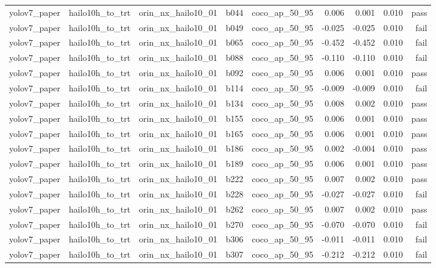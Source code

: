 \begin{table}[t]
\begin{tabular}{lrrrrrrrr}
yolov7\_paper & hailo10h\_to\_trt & orin\_nx\_hailo10\_01 & b044 & coco\_ap\_50\_95 & 0.006 & 0.001 & 0.010 & pass \\
yolov7\_paper & hailo10h\_to\_trt & orin\_nx\_hailo10\_01 & b049 & coco\_ap\_50\_95 & -0.025 & -0.025 & 0.010 & fail \\
yolov7\_paper & hailo10h\_to\_trt & orin\_nx\_hailo10\_01 & b065 & coco\_ap\_50\_95 & -0.452 & -0.452 & 0.010 & fail \\
yolov7\_paper & hailo10h\_to\_trt & orin\_nx\_hailo10\_01 & b088 & coco\_ap\_50\_95 & -0.110 & -0.110 & 0.010 & fail \\
yolov7\_paper & hailo10h\_to\_trt & orin\_nx\_hailo10\_01 & b092 & coco\_ap\_50\_95 & 0.006 & 0.001 & 0.010 & pass \\
yolov7\_paper & hailo10h\_to\_trt & orin\_nx\_hailo10\_01 & b114 & coco\_ap\_50\_95 & -0.009 & -0.009 & 0.010 & fail \\
yolov7\_paper & hailo10h\_to\_trt & orin\_nx\_hailo10\_01 & b134 & coco\_ap\_50\_95 & 0.008 & 0.002 & 0.010 & pass \\
yolov7\_paper & hailo10h\_to\_trt & orin\_nx\_hailo10\_01 & b155 & coco\_ap\_50\_95 & 0.006 & 0.001 & 0.010 & pass \\
yolov7\_paper & hailo10h\_to\_trt & orin\_nx\_hailo10\_01 & b165 & coco\_ap\_50\_95 & 0.006 & 0.001 & 0.010 & pass \\
yolov7\_paper & hailo10h\_to\_trt & orin\_nx\_hailo10\_01 & b186 & coco\_ap\_50\_95 & 0.002 & -0.004 & 0.010 & pass \\
yolov7\_paper & hailo10h\_to\_trt & orin\_nx\_hailo10\_01 & b189 & coco\_ap\_50\_95 & 0.006 & 0.001 & 0.010 & pass \\
yolov7\_paper & hailo10h\_to\_trt & orin\_nx\_hailo10\_01 & b222 & coco\_ap\_50\_95 & 0.007 & 0.002 & 0.010 & pass \\
yolov7\_paper & hailo10h\_to\_trt & orin\_nx\_hailo10\_01 & b228 & coco\_ap\_50\_95 & -0.027 & -0.027 & 0.010 & fail \\
yolov7\_paper & hailo10h\_to\_trt & orin\_nx\_hailo10\_01 & b262 & coco\_ap\_50\_95 & 0.007 & 0.002 & 0.010 & pass \\
yolov7\_paper & hailo10h\_to\_trt & orin\_nx\_hailo10\_01 & b270 & coco\_ap\_50\_95 & -0.070 & -0.070 & 0.010 & fail \\
yolov7\_paper & hailo10h\_to\_trt & orin\_nx\_hailo10\_01 & b306 & coco\_ap\_50\_95 & -0.011 & -0.011 & 0.010 & fail \\
yolov7\_paper & hailo10h\_to\_trt & orin\_nx\_hailo10\_01 & b307 & coco\_ap\_50\_95 & -0.212 & -0.212 & 0.010 & fail \\

\end{tabular}
\end{table}
